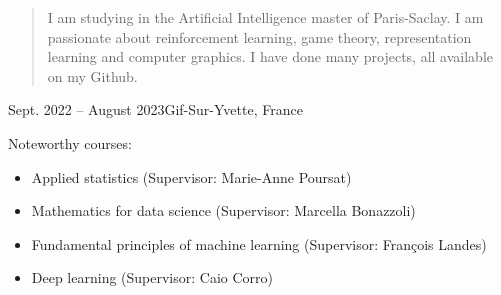 \documentclass[10pt,a4paper,ragged2e,withhyper]{altacv}
\begin{document}
\begin{paracol}{2}
        
        
        \newpage
        
        \switchcolumn
        
            \begin{quote}
              I am studying in the Artificial Intelligence master of Paris-Saclay.
              I am passionate about reinforcement learning, game theory,
              representation learning and computer graphics.
              I have done many projects, all available on my Github.
            \end{quote}
        
        
            {Sept. 2022 -- August 2023}{Gif-Sur-Yvette, France}
            \divider

            Noteworthy courses:
            \vspace{4pt}
            \begin{itemize}
              \item Applied statistics (Supervisor: Marie-Anne Poursat)
              \item Mathematics for data science (Supervisor: Marcella Bonazzoli)
              \item Fundamental principles of machine learning (Supervisor: François Landes)
              \item Deep learning (Supervisor: Caio Corro)
            \end{itemize}
            \divider


\end{paracol}
\end{document}
